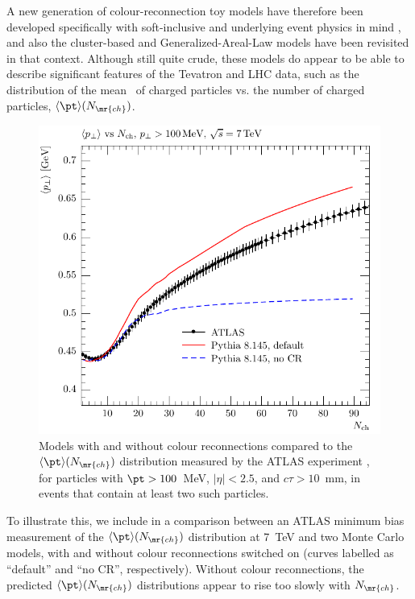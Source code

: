 A new generation of colour-reconnection toy models have therefore been
developed specifically with soft-inclusive and underlying event
physics in mind \cite{Sandhoff:2005jh,Skands:2007zg,Skands:2010ak},
and also the cluster-based \cite{Webber:1997iw} and Generalized-Areal-Law
\cite{Rathsman:1998tp} models have been revisited in that context.
Although still quite crude, these models do appear to be able to
describe significant features of the Tevatron and LHC data, such as
the distribution of the mean \pt\  of charged particles vs. the number of charged particles, $\langle \pt \rangle(N_{\mr{ch}})$.
\begin{figure}[t]
\center
\includegraphics*[scale=0.75]{mc-plots/ATLAS_2010_CONF_2010_046-inline/ATLAS_2010_CONF_2010_046_d03-x04-y01}
\caption{Models with and without colour reconnections compared to
the $\langle \pt \rangle (N_{\mr{ch}})$ distribution measured by the ATLAS
experiment \cite{Atlas:2010xx}, 
for particles with $\pt>100$~MeV, $|\eta|<2.5$, and $c\tau > 10$~mm,
in events that contain at least two such particles. \label{fig:mbptofnch}}
\end{figure}
To illustrate this, we include in  a comparison
between an ATLAS minimum bias measurement of the $\langle \pt \rangle
(N_{\mr{ch}})$ distribution at 7~TeV and two Monte Carlo models,
with and without colour reconnections switched on (curves labelled as
``default'' and ``no CR'', respectively). Without colour
reconnections, the predicted  $\langle \pt \rangle
(N_{\mr{ch}})$ distributions appear to rise too slowly with $N_{\mr{ch}}$.

